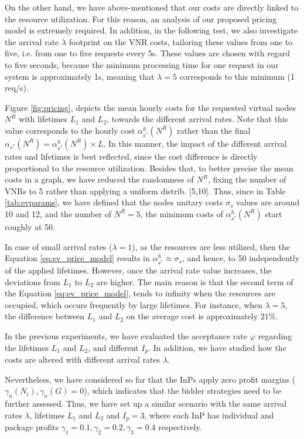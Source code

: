 On the other hand, we have above-mentioned that our costs are directly linked to the resource utilization. For this reason, an analysis of our proposed pricing model is extremely required. In addition, in the following test, we also investigate the arrival rate $\lambda$ footprint on the VNR costs, tailoring these values from one to five, i.e. from one to five requests every 5s. These values are chosen with regard to five seconds, because the minimum processing time for one request in our system is approximately 1s, meaning that $\lambda = 5$ corresponds to this minimum (1 req/s).

Figure \ref{fig:pricing}, depicts the mean hourly costs for the requested virtual nodes $N^R$ with lifetimes $L_1$ and $L_2$, towards the different arrival rates. Note that this value corresponds to the hourly cost $\alpha^{h}_{s^{*}}(N^R)$ rather than the final $ \alpha_{s^{*}}(N^R) = \alpha^{h}_{s^{*}}(N^R) \times L$. In this manner, the impact of the different arrival rates and lifetimes is best reflected, since the cost difference is directly proportional to the resource utilization. Besides that, to better precise the mean costs in a graph, we have reduced the randomness of $N^R$, fixing the number of VNRs to 5 rather than applying a uniform distrib. [5,10]. Thus, since in Table \ref{tab:evparams}, we have defined that the nodes unitary costs $\sigma_s$ values are around 10 and 12, and the number of $N^R = 5$, the minimum costs of $\alpha^{h}_{s^{*}}(N^R)$ start roughly at 50.

In case of small arrival rates ($\lambda = 1$), as the resources are less utilized, then the Equation \ref{eq:ev_price_model} results in $\alpha^{h}_{s^{*}} \approx \sigma_s$, and hence, to 50 independently of the applied lifetimes. However, once the arrival rate value increases, the deviations from $L_1$ to $L_2$ are higher. The main reason is that the second term of the Equation \ref{eq:ev_price_model}, tends to infinity when the resources are occupied, which occurs frequently by large lifetimes. For instance, when $\lambda = 5$, the difference between $L_1$ and $L_2$ on the average cost is approximately $21\%$.

In the previous experiments, we have evaluated the acceptance rate $\varphi$ regarding the lifetimes $L_1$ and $L_2$, and different $I_p$. In addition, we have studied how the costs are altered with different arrival rates $\lambda$. 

Nevertheless, we have considered so far that the InPs apply zero profit margins ($\gamma_n(N_i), \gamma_n(G) = 0$), which indicates that the bidder strategies need to be further assessed. Thus, we have set up a similar scenario with the same arrival rates $\lambda$, lifetimes $L_1$ and $L_2$ and $I_p = 3$, where each InP has individual and package profits $\gamma_1 = 0.1, \gamma_2 = 0.2, \gamma_3 = 0.4$ respectively. 

